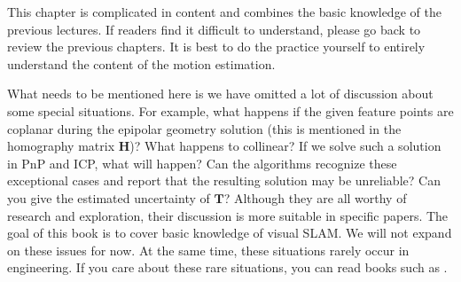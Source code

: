 This chapter is complicated in content and combines the basic knowledge of the previous lectures. If readers find it difficult to understand, please go back to review the previous chapters. It is best to do the practice yourself to entirely understand the content of the motion estimation.

What needs to be mentioned here is we have omitted a lot of discussion about some special situations. For example, what happens if the given feature points are coplanar during the epipolar geometry solution (this is mentioned in the homography matrix $\mathbf{H}$)? What happens to collinear? If we solve such a solution in PnP and ICP, what will happen? Can the algorithms recognize these exceptional cases and report that the resulting solution may be unreliable? Can you give the estimated uncertainty of $\mathbf{T}$? Although they are all worthy of research and exploration, their discussion is more suitable in specific papers. The goal of this book is to cover basic knowledge of visual SLAM. We will not expand on these issues for now. At the same time, these situations rarely occur in engineering. If you care about these rare situations, you can read books such as \cite{Hartley2003}.


